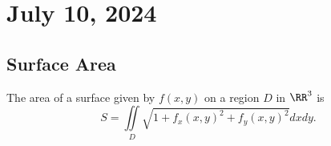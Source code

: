 \chapter{July 10, 2024}

\section{Surface Area}

\begin{proposition}
    The area of a surface given by $f(x, y)$ on a region $D$ in $\RR^{3}$ is
    \[S = \iint\limits_{D}\sqrt{1 + f_{x}(x, y)^{2} + f_{y}(x, y)^{2}}dxdy.\]
\end{proposition}